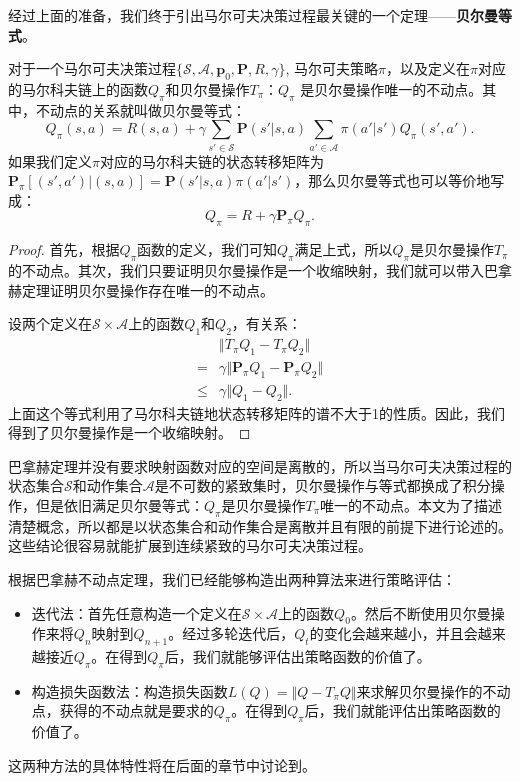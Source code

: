 经过上面的准备，我们终于引出马尔可夫决策过程最关键的一个定理——\textbf{贝尔曼等式}。
\begin{theorem}\label{thm:bellman-equation}
    对于一个马尔可夫决策过程$\{\mathcal{S}, \mathcal{A}, \mathbf{p}_0, \mathbf{P}, R, \gamma\}$, 马尔可夫策略$\pi$，以及定义在$\pi$对应的马尔科夫链上的函数$Q_\pi$和贝尔曼操作$T_\pi$：$Q_\pi$ 是贝尔曼操作唯一的不动点。其中，不动点的关系就叫做贝尔曼等式：
    \begin{equation}
        Q_\pi(s, a) = R(s, a) + \gamma \sum_{s'\in \mathcal{S}}\mathbf{P}(s' \vert s, a)
        \sum_{a' \in \mathcal{A}} \pi(a' \vert s') Q_\pi(s', a').
    \end{equation}
    如果我们定义$\pi$对应的马尔科夫链的状态转移矩阵为$\mathbf{P}_\pi[(s', a') \vert (s, a)] = \mathbf{P}(s' \vert s, a)\pi(a' \vert s')$，那么贝尔曼等式也可以等价地写成：
    \begin{equation}
        Q_\pi = R + \gamma \mathbf{P}_\pi Q_\pi.
    \end{equation}
\end{theorem}
\begin{proof}
    首先，根据$Q_\pi$函数的定义，我们可知$Q_\pi$满足上式，所以$Q_\pi$是贝尔曼操作$T_\pi$的不动点。其次，我们只要证明贝尔曼操作是一个收缩映射，我们就可以带入巴拿赫定理证明贝尔曼操作存在唯一的不动点。

    设两个定义在$\mathcal{S}\times\mathcal{A}$上的函数$Q_1$和$Q_2$，有关系：
    \begin{align*}
        &\Vert T_\pi Q_1 - T_\pi Q_2 \Vert \\
        =& \gamma \Vert \mathbf{P}_\pi Q_1 - \mathbf{P}_\pi Q_2 \Vert \\
        \le& \gamma \Vert Q_1 - Q_2 \Vert.
    \end{align*}
    上面这个等式利用了马尔科夫链地状态转移矩阵的谱不大于1的性质。因此，我们得到了贝尔曼操作是一个收缩映射。
\end{proof}

\begin{remark}
巴拿赫定理并没有要求映射函数对应的空间是离散的，所以当马尔可夫决策过程的状态集合$\mathcal{S}$和动作集合$\mathcal{A}$是不可数的紧致集时，贝尔曼操作与等式都换成了积分操作，但是依旧满足贝尔曼等式：$Q_\pi$是贝尔曼操作$T_\pi$唯一的不动点。本文为了描述清楚概念，所以都是以状态集合和动作集合是离散并且有限的前提下进行论述的。这些结论很容易就能扩展到连续紧致的马尔可夫决策过程。
\end{remark}

根据巴拿赫不动点定理，我们已经能够构造出两种算法来进行策略评估：
\begin{itemize}
    \item 迭代法：首先任意构造一个定义在$\mathcal{S}\times\mathcal{A}$上的函数$Q_0$。然后不断使用贝尔曼操作来将$Q_n$映射到$Q_{n+1}$。经过多轮迭代后，$Q_t$的变化会越来越小，并且会越来越接近$Q_\pi$。在得到$Q_\pi$后，我们就能够评估出策略函数的价值了。
    \item 构造损失函数法：构造损失函数$L(Q) = \Vert Q - T_\pi Q \Vert$来求解贝尔曼操作的不动点，获得的不动点就是要求的$Q_\pi$。在得到$Q_\pi$后，我们就能评估出策略函数的价值了。
\end{itemize}
这两种方法的具体特性将在后面的章节中讨论到。

